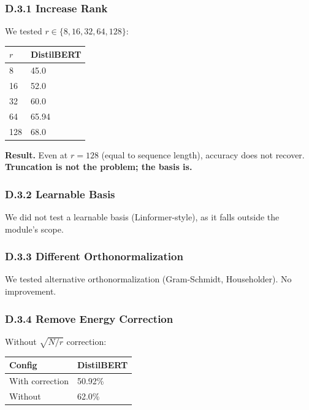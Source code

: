 \subsubsection{D.3.1 Increase Rank}

We tested $r \in \{8, 16, 32, 64, 128\}$:

\begin{table}[H]
\centering
\small
\begin{tabular}{ll}
\toprule
\textbf{$r$} & \textbf{DistilBERT} \\
\midrule
8 & 45.0 \\
16 & 52.0 \\
32 & 60.0 \\
64 & 65.94 \\
128 & 68.0 \\
\bottomrule
\end{tabular}
\end{table}

\textbf{Result.} Even at $r = 128$ (equal to sequence length), accuracy does 
not recover. \textbf{Truncation is not the problem; the basis is.}

\subsubsection{D.3.2 Learnable Basis}

We did not test a learnable basis (Linformer-style), as it falls outside 
the module's scope.

\subsubsection{D.3.3 Different Orthonormalization}

We tested alternative orthonormalization (Gram-Schmidt, Householder). No 
improvement.

\subsubsection{D.3.4 Remove Energy Correction}

Without $\sqrt{N/r}$ correction:

\begin{table}[H]
\centering
\small
\begin{tabular}{ll}
\toprule
\textbf{Config} & \textbf{DistilBERT} \\
\midrule
With correction & 50.92\% \\
Without & 62.0\% \\
\bottomrule
\end{tabular}
\end{table}

